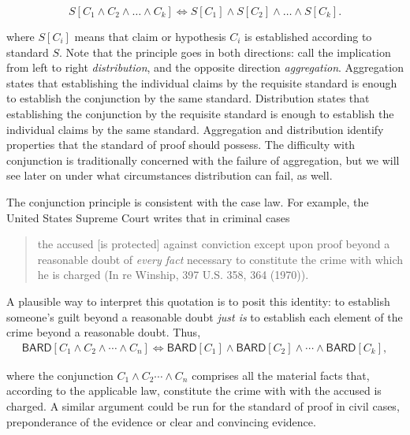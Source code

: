 \documentclass[
  10pt,
  dvipsnames,enabledeprecatedfontcommands]{scrartcl}
\newcommand{\et}{\wedge}
\begin{document}
\[S[C_1 \wedge C_2  \wedge \dots \wedge  C_k] \Leftrightarrow S[C_1] \wedge S[C_2]  \wedge \dots \wedge  S[C_k].\]

\noindent where \(S[C_i]\) means that claim or hypothesis \(C_i\) is
established according to standard \(S\). Note that the principle goes in
both directions: call the implication from left to right
\textit{distribution}, and the opposite direction \textit{aggregation}.
Aggregation states that establishing the individual claims by the
requisite standard is enough to establish the conjunction by the same
standard. Distribution states that establishing the conjunction by the
requisite standard is enough to establish the individual claims by the
same standard. Aggregation and distribution identify properties that the
standard of proof should possess. The difficulty with conjunction is
traditionally concerned with the failure of aggregation, but we will see
later on under what circumstances distribution can fail, as well.

The conjunction principle is consistent with the case law. For example,
the United States Supreme Court writes that in criminal cases

\begin{quote}
the accused [is protected] against conviction except upon proof beyond a reasonable doubt of \textit{every fact} necessary to constitute the crime with which he is charged
(In re Winship, 397 U.S. 358, 364 (1970)).
 
\end{quote}

\noindent A plausible way to interpret this quotation is to posit this
identity: to establish someone's guilt beyond a reasonable doubt
\textit{just is} to establish each element of the crime beyond a
reasonable doubt. Thus,
\begin{align*}\mathsf{BARD}[C_1 \wedge C_2   \wedge \cdots \wedge C_n] \Leftrightarrow \mathsf{BARD}[C_1] \wedge \mathsf{BARD}[C_2]  \wedge \cdots \wedge \mathsf{BARD}[C_k],
\end{align*}

\noindent where the conjunction \(C_1 \et C_2 \cdots \et C_n\) comprises
all the material facts that, according to the applicable law, constitute
the crime with with the accused is charged. A similar argument could be
run for the standard of proof in civil cases, preponderance of the
evidence or clear and convincing evidence.
\end{document}
